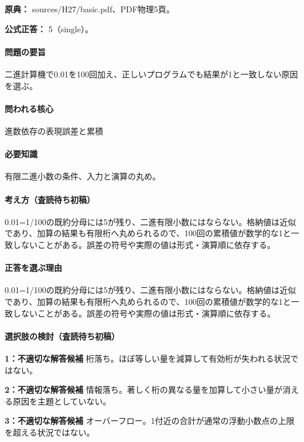 \noindent\textbf{原典：} sources/H27/basic.pdf、PDF物理5頁。

\textbf{公式正答：} 5（single）。

\paragraph{問題の要旨} 二進計算機で0.01を100回加え、正しいプログラムでも結果が1と一致しない原因を選ぶ。

\paragraph{問われる核心} 進数依存の表現誤差と累積

\paragraph{必要知識} 有限二進小数の条件、入力と演算の丸め。

\paragraph{考え方（査読待ち初稿）} 0.01=1/100の既約分母には5が残り、二進有限小数にはならない。格納値は近似であり、加算の結果も有限桁へ丸められるので、100回の累積値が数学的な1と一致しないことがある。誤差の符号や実際の値は形式・演算順に依存する。

\paragraph{正答を選ぶ理由} 0.01=1/100の既約分母には5が残り、二進有限小数にはならない。格納値は近似であり、加算の結果も有限桁へ丸められるので、100回の累積値が数学的な1と一致しないことがある。誤差の符号や実際の値は形式・演算順に依存する。

\paragraph{選択肢の検討（査読待ち初稿）}

\noindent\textbf{1：不適切な解答候補} 桁落ち。ほぼ等しい量を減算して有効桁が失われる状況ではない。\par

\noindent\textbf{2：不適切な解答候補} 情報落ち。著しく桁の異なる量を加算して小さい量が消える原因を主題としていない。\par

\noindent\textbf{3：不適切な解答候補} オーバーフロー。1付近の合計が通常の浮動小数点の上限を超える状況ではない。\par

